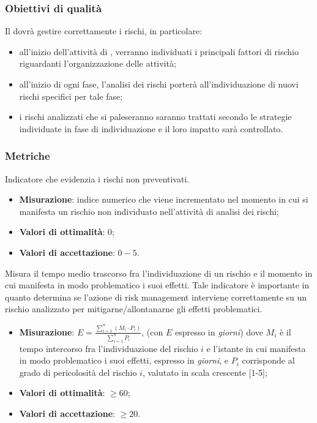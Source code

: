 \subsubsection{Obiettivi di qualità}
Il  dovrà gestire correttamente i rischi, in particolare:
\begin{itemize}
\item all'inizio dell'attività di , verranno individuati i principali fattori di rischio riguardanti l'organizzazione delle attività;
\item all'inizio di ogni fase, l'analisi dei rischi porterà all'individuazione di nuovi rischi specifici per tale fase;
\item i rischi analizzati che si paleseranno saranno trattati secondo le strategie individuate in fase di individuazione e il loro impatto sarà controllato.
\end{itemize}
\subsubsection{Metriche}
\label{riskNonPrev}
Indicatore che evidenzia i rischi non preventivati.
\begin{itemize}
\item \textbf{Misurazione}: indice numerico che viene incrementato nel momento in cui si manifesta un rischio non individuato nell'attività di analisi dei rischi;
\item \textbf{Valori di ottimalità}: $0$;
\item \textbf{Valori di accettazione}: $0 - 5$.
\end{itemize}
\label{effGestRischi}
Misura il tempo medio trascorso fra l'individuazione di un rischio e il momento in cui manifesta in modo problematico i suoi effetti. Tale indicatore è importante in quanto determina se l'azione di risk management interviene correttamente su un rischio analizzato per mitigarne/allontanarne gli effetti problematici.
\begin{itemize}
\item \textbf{Misurazione}: $E = \frac{\sum_{i=1}^{n} (M_{i} \cdot P_{i})}{\sum_{i=1}^{n} P_{i}}$, (con $E$ espresso in \textit{giorni}) dove $M_{i}$ è il tempo intercorso fra l'individuazione del rischio $i$ e l'istante in cui manifesta in modo problematico i suoi effetti, espresso in \textit{giorni}, e $P_{i}$ corrisponde al grado di pericolosità del rischio $i$, valutato in scala crescente [1-5];
\item \textbf{Valori di ottimalità}: $\geq 60$;
\item \textbf{Valori di accettazione}: $\geq 20$.
\end{itemize}
